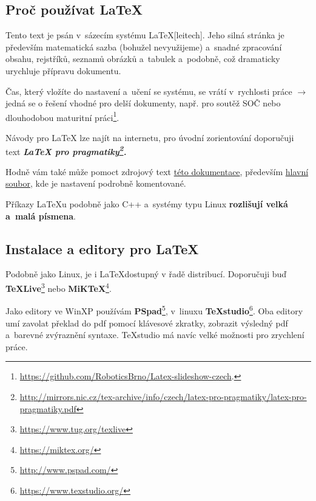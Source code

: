 \subsection{Proč používat \LaTeX} 

Tento text je psán v~sázecím systému  \LaTeX [leitech]. 
Jeho silná stránka je především matematická sazba 
(bohužel nevyužijeme) a~snadné zpracování obsahu, rejstříků, seznamů obrázků a~tabulek a~podobně, což dramaticky urychluje přípravu dokumentu. 

Čas, který vložíte do nastavení a~učení se systému, se vrátí v~rychlosti práce
 $\rightarrow$ jedná se o řešení vhodné pro delší dokumenty, např. pro soutěž SOČ nebo dlouhodobou maturitní práci\footnote{\url{https://github.com/RoboticsBrno/Latex-slideshow-czech}.}. 
 
Návody pro \LaTeX{}  lze najít na internetu,  pro úvodní zorientování 
 doporučuji text  \bfseries \itshape  \LaTeX{} pro pragmatiky\footnote{\url{http://mirrors.nic.cz/tex-archive/info/czech/latex-pro-pragmatiky/latex-pro-pragmatiky.pdf} }\upshape \mdseries .

Hodně vám také může pomoct zdrojový text \href{https://github.com/RoboticsBrno/RoboticsBrno-guides/tree/RoboticsManual/RoboticsManual}{této dokumentace}, 
 především
 \href{https://github.com/RoboticsBrno/RoboticsBrno-guides/blob/RoboticsManual/RoboticsManual/_dokumentace.tex}{hlavní soubor},
 kde je nastavení podrobně komentované.  

Příkazy \LaTeX{}u podobně jako C++ a~systémy typu Linux {\bf rozlišují velká a~malá písmena}. 
 

\subsection{Instalace a editory pro \LaTeX}


Podobně jako Linux, je i \LaTeX dostupný v řadě distribucí. Doporučuji buď 
{\bf TeXLive}\footnote{\url{https://www.tug.org/texlive}} 
 nebo {\bf MiKTeX}\footnote{\url{https://miktex.org/}}.  
{\bf }

Jako editory ve WinXP používám {\bf PSpad}\footnote{\url{http://www.pspad.com/}}, v~linuxu {\bf TeXstudio}\footnote{\url{https://www.texstudio.org/}}.  
Oba editory umí zavolat překlad do pdf pomocí klávesové zkratky, zobrazit výsledný pdf a~barevné zvýraznění syntaxe. TeXstudio má navíc velké možnosti pro zrychlení práce.  


